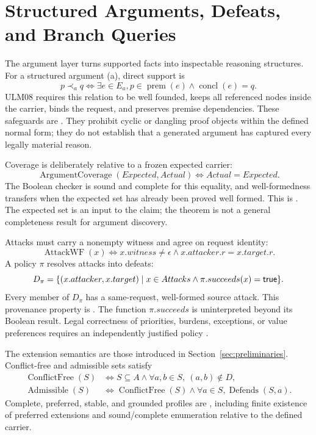 \section{Structured Arguments, Defeats, and Branch Queries}
\label{sec:aaf}

The argument layer turns supported facts into inspectable reasoning structures. For a structured argument (a), direct support is
\begin{equation}
p\prec_a q\iff\exists e\in E_a,
p\in\operatorname{prem}(e)\land\operatorname{concl}(e)=q.
\label{eq:direct-support}
\end{equation}
ULM08 requires this relation to be well founded, keeps all referenced nodes inside the carrier, binds the request, and preserves premise dependencies. These safeguards are \formalized{}. They prohibit cyclic or dangling proof objects within the defined normal form; they do not establish that a generated argument has captured every legally material reason.

Coverage is deliberately relative to a frozen expected carrier:
\begin{equation}
\operatorname{ArgumentCoverage}(Expected,Actual)
\iff Actual=Expected.
\label{eq:argument-coverage}
\end{equation}
The Boolean checker is sound and complete for this equality, and well-formedness transfers when the expected set has already been proved well formed. This is \formalized{}. The expected set is an input to the claim; the theorem is not a general completeness result for argument discovery.

Attacks must carry a nonempty witness and agree on request identity:
\begin{equation}
\operatorname{AttackWF}(x)\iff
x.witness\neq\epsilon\land x.attacker.r=x.target.r.
\label{eq:attack-wf}
\end{equation}
A policy $\pi$ resolves attacks into defeats:
\begin{equation}
D_{\pi}=\{(x.attacker,x.target)\mid
x\in Attacks\land\pi.succeeds(x)=\mathsf{true}\}.
\label{eq:resolved-defeat}
\end{equation}
Every member of $D_{\pi}$ has a same-request, well-formed source attack. This provenance property is \formalized{}. The function $\pi.succeeds$ is uninterpreted beyond its Boolean result. Legal correctness of priorities, burdens, exceptions, or value preferences requires an independently justified policy \citep{PrakkenSartor1997,ModgilPrakken2013,BenchCapon2003}.

The extension semantics are those introduced in Section~\ref{sec:preliminaries}. Conflict-free and admissible sets satisfy
\begin{align}
\operatorname{ConflictFree}(S)&\iff S\subseteq A\land
\forall a,b\in S,\ (a,b)\notin D,\label{eq:conflict-free}\\
\operatorname{Admissible}(S)&\iff
\operatorname{ConflictFree}(S)\land\forall a\in S,\operatorname{Defends}(S,a).
\label{eq:admissible}
\end{align}
Complete, preferred, stable, and grounded profiles are \formalized{}, including finite existence of preferred extensions and sound/complete enumeration relative to the defined carrier.


